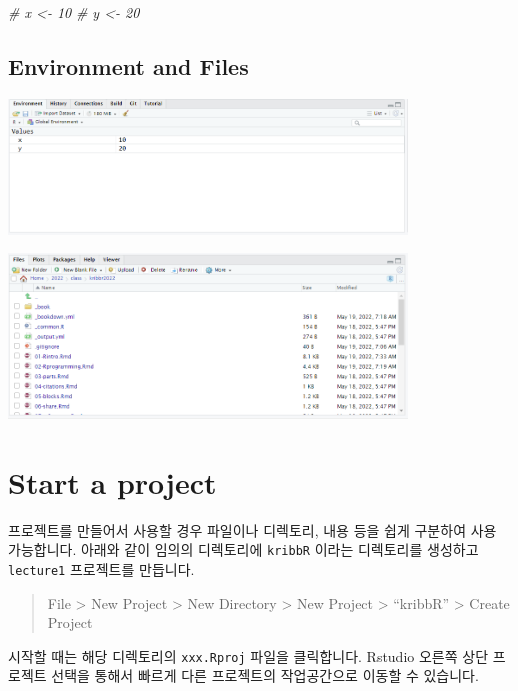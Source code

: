\documentclass[
]{book}
\newenvironment{Shaded}{\begin{snugshade}}{\end{snugshade}}
\newcommand{\CommentTok}[1]{\textcolor[rgb]{0.56,0.35,0.01}{\textit{#1}}}
\begin{document}
\begin{Shaded}
\begin{Highlighting}[]
\CommentTok{\# x \textless{}{-} 10}
\CommentTok{\# y \textless{}{-} 20}
\end{Highlighting}
\end{Shaded}

\hypertarget{environment-and-files}{%
\subsection{Environment and Files}\label{environment-and-files}}

\includegraphics[width=4.16667in,height=\textheight]{images/01/envandhist.png}

\includegraphics[width=4.16667in,height=\textheight]{images/01/fileandpackages.png}

\hypertarget{start-a-project}{%
\section{Start a project}\label{start-a-project}}

프로젝트를 만들어서 사용할 경우 파일이나 디렉토리, 내용 등을 쉽게 구분하여 사용 가능합니다. 아래와 같이 임의의 디렉토리에 \texttt{kribbR} 이라는 디렉토리를 생성하고 \texttt{lecture1} 프로젝트를 만듭니다.

\begin{quote}
File \textgreater{} New Project \textgreater{} New Directory \textgreater{} New Project \textgreater{} ``kribbR'' \textgreater{} Create Project
\end{quote}

시작할 때는 해당 디렉토리의 \texttt{xxx.Rproj} 파일을 클릭합니다. Rstudio 오른쪽 상단 프로젝트 선택을 통해서 빠르게 다른 프로젝트의 작업공간으로 이동할 수 있습니다.
\end{document}
